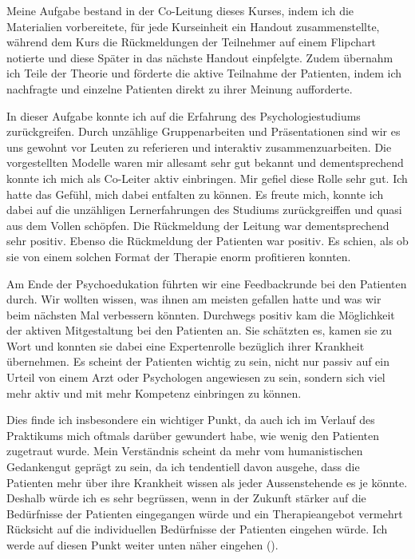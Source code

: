 \documentclass[jou,apacite]{apa6}
\begin{document}
Meine Aufgabe bestand in der Co-Leitung dieses Kurses, indem ich die Materialien vorbereitete, für jede Kurseinheit ein Handout zusammenstellte, während dem Kurs die Rückmeldungen der Teilnehmer auf einem Flipchart notierte und diese Später in das nächste Handout einpfelgte. Zudem übernahm ich Teile der Theorie und förderte die aktive Teilnahme der Patienten, indem ich nachfragte und einzelne Patienten direkt zu ihrer Meinung aufforderte. 

In dieser Aufgabe konnte ich auf die Erfahrung des Psychologiestudiums zurückgreifen. Durch unzählige Gruppenarbeiten und Präsentationen sind wir es uns gewohnt vor Leuten zu referieren und interaktiv zusammenzuarbeiten. Die vorgestellten Modelle waren mir allesamt sehr gut bekannt und dementsprechend konnte ich mich als Co-Leiter aktiv einbringen. Mir gefiel diese Rolle sehr gut. Ich hatte das Gefühl, mich dabei entfalten zu können. Es freute mich, konnte ich dabei auf die unzähligen Lernerfahrungen des Studiums zurückgreiffen und quasi aus dem Vollen schöpfen. Die Rückmeldung der Leitung war dementsprechend sehr positiv. Ebenso die Rückmeldung der Patienten war positiv. Es schien, als ob sie von einem solchen Format der Therapie enorm profitieren konnten. 

Am Ende der Psychoedukation führten wir eine Feedbackrunde bei den Patienten durch. Wir wollten wissen, was ihnen am meisten gefallen hatte und was wir beim nächsten Mal verbessern könnten. Durchwegs positiv kam die Möglichkeit der aktiven Mitgestaltung bei den Patienten an. Sie schätzten es, kamen sie zu Wort und konnten sie dabei eine Expertenrolle bezüglich ihrer Krankheit übernehmen. Es scheint der Patienten wichtig zu sein, nicht nur passiv auf ein Urteil von einem Arzt oder Psychologen angewiesen zu sein, sondern sich viel mehr aktiv und mit mehr Kompetenz einbringen zu können.

Dies finde ich insbesondere ein wichtiger Punkt, da auch ich im Verlauf des Praktikums mich oftmals darüber gewundert habe, wie wenig den Patienten zugetraut wurde. Mein Verständnis scheint da mehr vom humanistischen Gedankengut geprägt zu sein, da ich tendentiell davon ausgehe, dass die Patienten mehr über ihre Krankheit wissen als jeder Aussenstehende es je könnte. Deshalb würde ich es sehr begrüssen, wenn in der Zukunft stärker auf die Bedürfnisse der Patienten eingegangen würde und ein Therapieangebot vermehrt Rücksicht auf die individuellen Bedürfnisse der Patienten eingehen würde. Ich werde auf diesen Punkt weiter unten näher eingehen ().
\end{document}
